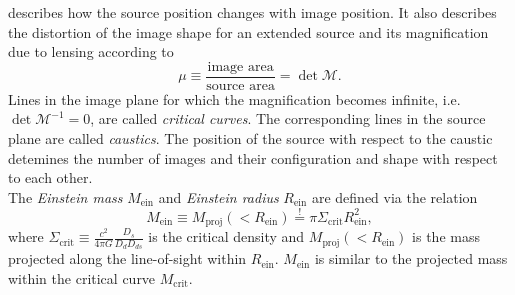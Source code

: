 describes how the source position changes with image position. It also describes the distortion of the image shape for an extended source and its magnification due to lensing according to
$$\mu \equiv \frac{\text{image area}}{\text{source area}} = \det \mathscr{M}.$$
Lines in the image plane for which the magnification becomes infinite, i.e. $\det \mathscr{M}^{-1} = 0$, are called \emph{critical curves}. The corresponding lines in the source plane are called \emph{caustics}. The position of the source with respect to the caustic detemines the number of images and their configuration and shape with respect to each other.
\\The \emph{Einstein mass} $M_\text{ein}$ and \emph{Einstein radius} $R_\text{ein}$ are defined via the relation
\begin{equation*}
M_\text{ein} \equiv M_\text{proj}(<R_\text{ein}) \overset{!}{=} \pi \Sigma_\text{crit} R_\text{ein}^2,
\end{equation*}
where $\Sigma_\text{crit} \equiv \frac{c^2}{4\pi G} \frac{D_s}{D_d D_{ds}}$ is the critical density and $M_\text{proj}(<R_\text{ein})$ is the mass projected along the line-of-sight within $R_\text{ein}$. $M_\text{ein}$ is similar to the projected mass within the critical curve $M_\text{crit}$.

